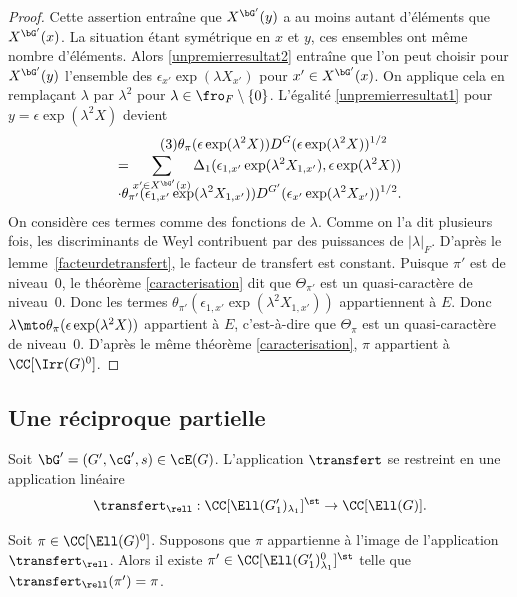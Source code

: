 \begin{proof}
Cette assertion entraîne que $X^{\bG'}(y)$ a au moins autant d'éléments que $X^{\bG'}(x)$. La situation étant symétrique en $x$ et $y$, ces ensembles ont même nombre d'éléments. Alors \eqref{unpremierresultat2} entraîne que l'on peut choisir pour $X^{\bG'}(y)$ l'ensemble des $\epsilon_{x'}\exp(\lambda X_{x'})$ pour $x'\in X^{\bG'}(x)$. On applique cela en remplaçant $\lambda$ par $\lambda^2$ pour $\lambda\in \fro_{F}\setminus\{0\}$. L'égalité \eqref{unpremierresultat1} pour $y=\epsilon \exp(\lambda^2 X)$ devient
\begin{multline*}\tag{3}\label{unpremierresultat3}
\theta_{\pi}(\epsilon \exp(\lambda^2X))D^G(\epsilon \exp(\lambda^2 X))^{1/2}\\[-3pt]
=\sum_{x'\in X^{\bG'}(x)}\Delta_{1}(\epsilon_{1,x'}\exp(\lambda^2X_{1,x'}),\epsilon \exp(\lambda^2X))
\\[-10pt]
\cdot\theta_{\pi'}(\epsilon_{1,x'}\exp(\lambda^2X_{1,x'}))D^{G'}(\epsilon_{x'}\exp(\lambda^2X_{x'}))^{1/2}.
\end{multline*}
On considère ces termes comme des fonctions de $\lambda$. Comme on l'a dit plusieurs fois, les discriminants de Weyl contribuent par des puissances de $\vert \lambda\vert _{F}$. D'après le lemme~\ref{facteurdetransfert}, le facteur de transfert est constant. Puisque $\pi'$ est de niveau~$0$, le théorème \ref{caracterisation} dit que $\Theta_{\pi'}$ est un quasi-caractère de niveau~$0$. Donc les termes $\theta_{\pi'}(\epsilon_{1,x'}\exp(\lambda^2X_{1,x'}))$ appartiennent à $E$. Donc $\lambda\mto \theta_{\pi}(\epsilon \exp(\lambda^2X))$ appartient à $E$, c'est-à-dire que $\Theta_{\pi}$ est un quasi-caractère de niveau~$0$. D'après le même théorème \ref{caracterisation}, $\pi$ appartient à $\CC[\Irr(G)^0]$.
\end{proof}

\subsection{Une réciproque partielle}\label{unereciproque}
Soit $\bG'=(G',\cG',s)\in \cE(G)$.
L'application $\transfert$ se restreint en une application linéaire
\[
\transfert_{\rell}:\CC[\Ell(G'_{1})_{\lambda_{1}}]^{\st}\to \CC[\Ell(G)].
\]
\begin{prop*}
Soit $\pi\in \CC[\Ell(G)^0]$. Supposons que $\pi$ appartienne à l'image de l'application $\transfert_{\rell}$. Alors il existe $\pi'\in \CC[\Ell(G'_{1})^0_{\lambda_{1}}]^{\st}$ telle que $\transfert_{\rell}(\pi')=\pi$.
\end{prop*}

